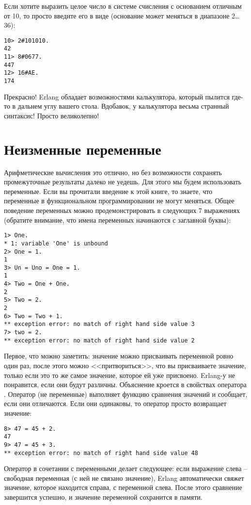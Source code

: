 Если хотите выразить целое число в системе счисления с основанием отличным от 10, то просто введите его в виде  (основание может меняться в диапазоне 2\ldots36):
\begin{lstlisting}[style=repl]
10> 2#101010.
42
11> 8#0677.
447
12> 16#AE.
174
\end{lstlisting}

Прекрасно! Erlang обладает возможностями калькулятора, который пылится где\--то в дальнем углу вашего стола. Вдобавок, у калькулятора весьма странный синтаксис! Просто великолепно!
\section{Неизменные переменные}\label{invariable-variables}
Арифметические вычисления это отлично, но без возможности сохранять промежуточные результаты далеко не уедешь. Для этого мы будем использовать переменные. Если вы прочитали введение к этой книге, то знаете, что переменные в функциональном программировании не могут меняться. Общее поведение переменных можно продемонстрировать в следующих 7 выражениях (обратите внимание, что имена переменных начинаются с заглавной буквы):
\begin{lstlisting}[style=repl]
1> One.
* 1: variable 'One' is unbound
2> One = 1.
1
3> Un = Uno = One = 1.
1
4> Two = One + One.
2
5> Two = 2.
2
6> Two = Two + 1.
** exception error: no match of right hand side value 3
7> two = 2.
** exception error: no match of right hand side value 2
\end{lstlisting}

Первое, что можно заметить: значение можно присваивать переменной ровно один раз, после этого можно <<притвориться>>, что вы присваиваете значение, только если это то же самое значение, которое ей уже присвоено. Erlang\--у не понравится, если они будут различны. Объяснение кроется в свойствах оператора \ops{\strut=}. Оператор \ops{\strut=} (не переменные) выполняет функцию сравнения значений и сообщает, если они отличаются. Если они одинаковы, то оператор просто возвращает значение:
\begin{lstlisting}[style=repl]
8> 47 = 45 + 2.
47
9> 47 = 45 + 3.
** exception error: no match of right hand side value 48
\end{lstlisting}

Оператор в сочетании с переменными делает следующее: если выражение слева \--- свободная переменная (с ней не связано значение), Erlang автоматически свяжет значение, которое находится справа, с переменной слева. После этого сравнение завершится успешно, и значение переменной сохранится в памяти.

